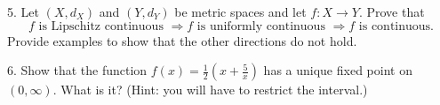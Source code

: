 \documentclass{article}
\theoremstyle{remark} %
\begin{document}



5. Let $(X,d_X)$ and $(Y,d_Y)$ be metric spaces and let $f:X\to Y$. Prove that
$$f \text{ is Lipschitz continuous } \Rightarrow f \text{ is uniformly continuous } \Rightarrow f \text{ is continuous}.$$
Provide examples to show that the other directions do not hold.

\vspace{21cm} %




6. Show that the function $f(x) = \frac{1}{2} \left(x + \frac{5}{x} \right)$ has a unique fixed point on $(0,\infty)$. What is it? (Hint: you will have to restrict the interval.)
\vspace{11cm} %

\end{document}
